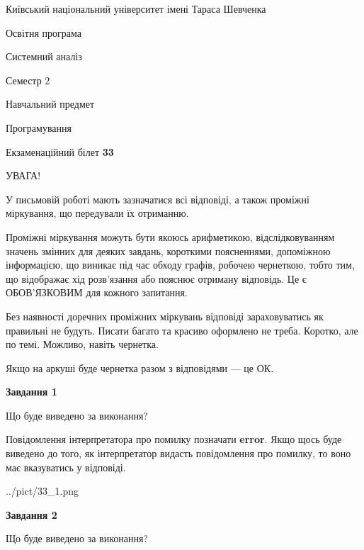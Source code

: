 \documentclass[12pt, ukrainian]{article}
\begin{document}
{{\begin {small}\par
{ \center  Київський національний університет імені Тараса Шевченка \par}
{\parbox {5 cm}{Освітня програма \hfill}{\parbox {7 cm}{Системний аналіз \hfill}}\parbox {6 cm}{\hfill Семестр 2}}\par
{\parbox {5 cm} {Навчальний предмет \hfill}\parbox {7 cm}{Програмування \hfill}\parbox {6cm}{\hfill}\par}\vspace{-7pt} \end{small}}{\center Екзаменаційний білет \No \textbf
{ 33 }\par}}
{
\begin {large}
УВАГА!

У письмовій роботі мають зазначатися всі відповіді, а також проміжні міркування, що передували їх отриманню.

Проміжні міркування можуть бути якоюсь арифметикою, відслідковуванням зна\-чень змінних для деяких завдань,
короткими поясненнями, допоміжною інформацією, що виникає під час обходу графів, робочею чернеткою,
тобто тим, що відображає хід розв’язання або пояснює отриману відповідь.
Це є ОБОВ’ЯЗКОВИМ для кожного запитання.

Без наявності доречних проміжних міркувань відповіді зараховуватись як правиль\-ні не будуть.
Писати багато та красиво оформлено не треба. Коротко, але по темі. Можли\-во, навіть чернетка.

Якщо на аркуші буде чернетка разом з відповідями --- це ОК.

\newpage

{\begin {center}\textbf{Завдання 1}\end {center}}\par
Що буде виведено за виконання?

Повідомлення інтерпретатора про помилку позначати \textbf{error}.
Якщо щось буде виведено до того, як інтерпретатор видасть повідомлення про помилку, 
то воно має вказуватись у відповіді. \par


\begin{center}
	{../pict/33_1.png}
\end{center}
\newpage

{\begin {center}\textbf{Завдання 2}\end {center}}\par
Що буде виведено за виконання?


\end{large}}
\end{document}
